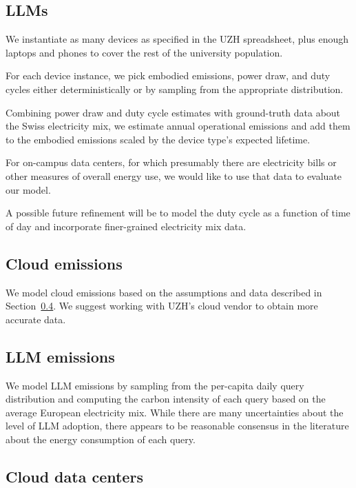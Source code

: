 \documentclass[11pt]{article}
\begin{document}
\subsection{LLMs}

We instantiate as many devices as specified in the UZH spreadsheet, plus enough laptops and phones
to cover the rest of the university population.

For each device instance, we pick embodied emissions, power draw, and duty cycles either
deterministically or by sampling from the appropriate distribution.

Combining power draw and duty cycle estimates with ground-truth data about the Swiss electricity mix,
we estimate annual operational emissions and add them to the embodied emissions scaled by the device
type's expected lifetime.

For on-campus data centers, for which presumably there are electricity bills or other measures of
overall energy use, we would like to use that data to evaluate our model.

A possible future refinement will be to model the duty cycle as a function of time of day
and incorporate finer-grained electricity mix data.

\subsection{Cloud emissions}

We model cloud emissions based on the assumptions and data described in
Section~\ref{sec:cloud_data_centers}. We suggest working with UZH's cloud vendor to obtain
more accurate data.

\subsection{LLM emissions}

We model LLM emissions by sampling from the per-capita daily query distribution and computing
the carbon intensity of each query based on the average European electricity mix. While there
are many uncertainties about the level of LLM adoption, there appears to be reasonable consensus
in the literature about the energy consumption of each query.

\subsection{Cloud data centers}
\label{sec:cloud_data_centers}
\end{document}
